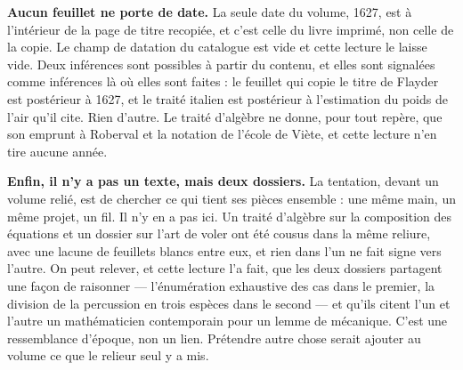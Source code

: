 \documentclass[11pt,a4paper]{article}
\begin{document}
\textbf{Aucun feuillet ne porte de date.} La seule date du volume, 1627, est à
l'intérieur de la page de titre recopiée, et c'est celle du livre imprimé, non
celle de la copie. Le champ de datation du catalogue est vide et cette lecture
le laisse vide. Deux inférences sont possibles à partir du contenu, et elles sont
signalées comme inférences là où elles sont faites : le feuillet qui copie le
titre de Flayder est postérieur à 1627, et le traité italien est postérieur à
l'estimation du poids de l'air qu'il cite. Rien d'autre. Le traité d'algèbre ne
donne, pour tout repère, que son emprunt à Roberval et la notation de l'école de
Viète, et cette lecture n'en tire aucune année.

\textbf{Enfin, il n'y a pas un texte, mais deux dossiers.} La tentation, devant
un volume relié, est de chercher ce qui tient ses pièces ensemble : une même
main, un même projet, un fil. Il n'y en a pas ici. Un traité d'algèbre sur la
composition des équations et un dossier sur l'art de voler ont été cousus dans la
même reliure, avec une lacune de feuillets blancs entre eux, et rien dans l'un ne
fait signe vers l'autre. On peut relever, et cette lecture l'a fait, que les deux
dossiers partagent une façon de raisonner — l'énumération exhaustive des cas dans
le premier, la division de la percussion en trois espèces dans le second — et
qu'ils citent l'un et l'autre un mathématicien contemporain pour un lemme de
mécanique. C'est une ressemblance d'époque, non un lien. Prétendre autre chose
serait ajouter au volume ce que le relieur seul y a mis.
\end{document}
